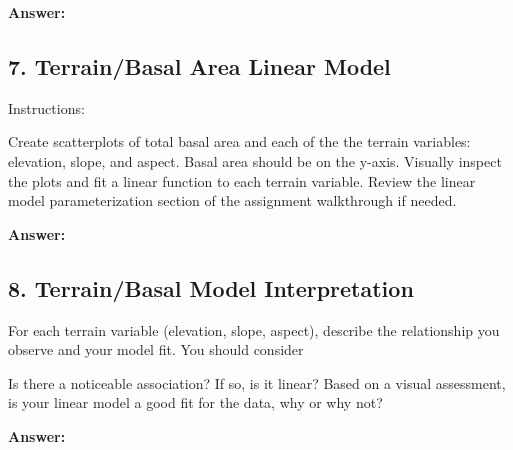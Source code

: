 \documentclass[
]{article}
\begin{document}
\textbf{Answer: }

\hypertarget{terrainbasal-area-linear-model}{%
\subsection{\texorpdfstring{7. \textbf{Terrain/Basal Area Linear
Model}}{7. Terrain/Basal Area Linear Model}}\label{terrainbasal-area-linear-model}}

Instructions:

Create scatterplots of total basal area and each of the the terrain
variables: elevation, slope, and aspect. Basal area should be on the
y-axis. Visually inspect the plots and fit a linear function to each
terrain variable. Review the linear model parameterization section of
the assignment walkthrough if needed.

\textbf{Answer: }

\hypertarget{terrainbasal-model-interpretation}{%
\subsection{\texorpdfstring{8. \textbf{Terrain/Basal Model
Interpretation}}{8. Terrain/Basal Model Interpretation}}\label{terrainbasal-model-interpretation}}

For each terrain variable (elevation, slope, aspect), describe the
relationship you observe and your model fit. You should consider

Is there a noticeable association? If so, is it linear? Based on a
visual assessment, is your linear model a good fit for the data, why or
why not?

\textbf{Answer: }
\end{document}
